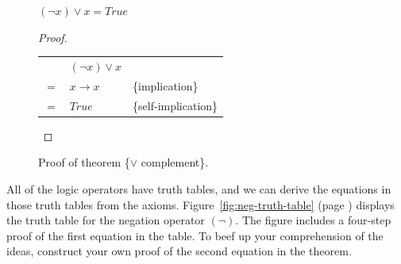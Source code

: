 \begin{figure}
\begin{theorem}
$(\neg x) \vee x = True$
\end{theorem}
\begin{proof}
\mbox{}\\
\begin{tabular}{lll}
    & $(\neg x) \vee x$ & \\
$=$ & $x \rightarrow x$ & \{implication\} \\
$=$ & $True$            & \{self-implication\} \\
\end{tabular}

\end{proof}
\caption{Proof of theorem \{$\vee$ complement\}.}
\label{fig:or-complement-thm}
\end{figure}

All of the logic operators have truth tables,
and we can derive the equations in those truth tables from the axioms.
Figure~\ref{fig:neg-truth-table} (page \pageref{fig:neg-truth-table})
displays the truth table
for the negation operator $(\neg)$.
The figure includes a four-step proof of the first equation in
the table.
To beef up your comprehension of the ideas,
construct your own proof of the second equation in the theorem.


